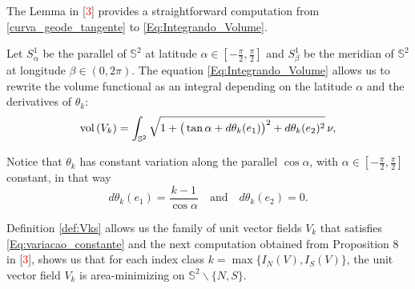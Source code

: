 \documentclass[reqno,11pt]{amsart}
\DeclareMathOperator{\vol}{\rm vol}
\begin{document}
\noindent The Lemma in [\textcolor{red}{3}] provides a straightforward computation from \eqref{curva_geode_tangente} to \eqref{Eq:Integrando_Volume}.

\noindent Let $S^1_\alpha$ be the parallel of $\mathbb{S}^2$ at latitude $\alpha \in \left[ -\frac{\pi}{2}, \frac{\pi}{2} \right]$ and $S^1_\beta$ be the meridian of $\mathbb{S}^2$ at longitude $\beta \in (0, 2\pi)$. 
 The equation \eqref{Eq:Integrando_Volume} allows us to rewrite the volume functional as an integral depending on the latitude $\alpha$ and the derivatives of $\theta_k$:
\begin{eqnarray}
    \vol\left(V_k\right) = \int_{\mathbb{S}^2} \sqrt{1+  \big( \tan \alpha + d\theta_k(e_1)\big)^2 + d\theta_k(e_2)^2}\,\nu,
\end{eqnarray}

\noindent Notice that $\theta_k$ has constant variation along the parallel $\cos \alpha$, with $\alpha \in \left[ -\frac{\pi}{2}, \frac{\pi}{2} \right]$ constant, in that way
\begin{equation}\label{Eq:variacao_constante}
d\theta_k(e_1) = \frac{k-1}{\cos \alpha}\quad\text{and}\quad d\theta_k(e_2) = 0.
\end{equation}

\noindent Definition \ref{def:Vks} allows us the family of unit vector fields $V_k$ that satisfies \eqref{Eq:variacao_constante} and the next computation obtained from Proposition 8 in [\textcolor{red}{3}], shows us that for each index class $k=\max\{I_N(V), I_S(V)\}$, the unit vector field $V_k$ is area-minimizing on $\mathbb{S}^2\backslash\{N,S\}$.  %
\end{document}
